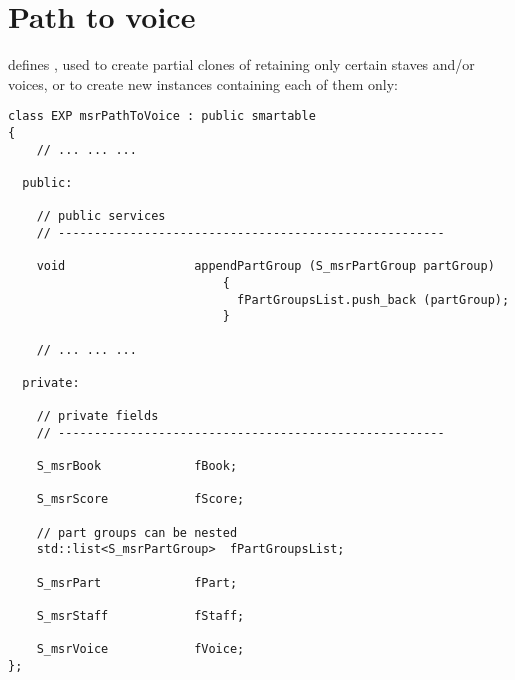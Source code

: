 
\chapter{Path to voice}\label{Path to voice}

 defines , used to create partial clones of  retaining only certain staves and/or voices, or to create new  instances containing each of them only:
\begin{lstlisting}[language=CPlusPlus]
class EXP msrPathToVoice : public smartable
{
	// ... ... ...

  public:

    // public services
    // ------------------------------------------------------

    void                  appendPartGroup (S_msrPartGroup partGroup)
                              {
                                fPartGroupsList.push_back (partGroup);
                              }

	// ... ... ...

  private:

    // private fields
    // ------------------------------------------------------

    S_msrBook             fBook;

    S_msrScore            fScore;

    // part groups can be nested
    std::list<S_msrPartGroup>  fPartGroupsList;

    S_msrPart             fPart;

    S_msrStaff            fStaff;

    S_msrVoice            fVoice;
};
\end{lstlisting}

